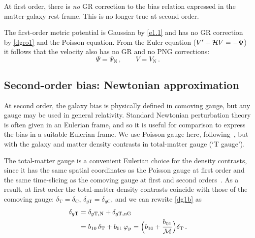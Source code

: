{At first order,  there is {\em no} GR correction to the  bias relation  expressed in the matter-galaxy rest frame. This is no longer true at second order.

The first-order metric  potential is Gaussian by \eqref{e1.1} and has no GR correction by \eqref{dgro1} and  the Poisson equation. From the Euler equation ($V'+{\cal H}V=- \Psi$) it follows that the velocity also has no GR and no PNG corrections:
\begin{equation} \label{pvo1}
\Psi=\Psi_{\mathrm{N}}\,,\qquad V=V_{\mathrm{N}}\,.
\end{equation}
%
\subsection{Second-order bias: {Newtonian} approximation}
%
At second order, the  galaxy bias is {physically} defined in comoving gauge, {but any gauge may be used in general relativity. Standard Newtonian perturbation theory is often given in an Eulerian frame, and so it is useful for comparison}  to express the  bias in a suitable Eulerian frame. We use Poisson gauge here, following~\cite{Umeh:2016nuh,Tram:2016cpy, Jolicoeur:2017nyt, Jolicoeur:2017eyi, Jolicoeur:2018blf,Clarkson:2018dwn,Maartens:2019yhx,deWeerd:2019cae}, but with the galaxy and matter density contrasts in total-matter gauge (`T gauge').}  {The total-matter gauge is a convenient  Eulerian choice  for the density contrasts, since it has the same spatial coordinates as the Poisson gauge at first order and the same time-slicing as the comoving gauge at first and second orders~\cite{Bartolo:2015qva,Villa:2015ppa,Tram:2016cpy}. 
As a result, at first order
the total-matter density contrasts coincide with those of the comoving gauge: 
$\delta_{{\mathrm{T}}}=\delta_{{\mathrm{C}}}$, $\delta_{g{\mathrm{T}}}=\delta_{g{\mathrm{C}}}$, 
and we can rewrite  \eqref{dg1b} as 
\begin{align}
\delta_{g{\mathrm{T}}} &={\delta_{g \mathrm{T,N}} + \delta_{g{\mathrm{T,nG}}}} \\
&=b_{10}\,\delta_{\mathrm{T}}+ b_{01}\,\varphi_{\mathrm{p}}={\Big(b_{10} + \frac{b_{01}}{{\cal M}} \Big) \delta_{\mathrm{T}}}\,.
 \label{dg1bt}
\end{align}

}

